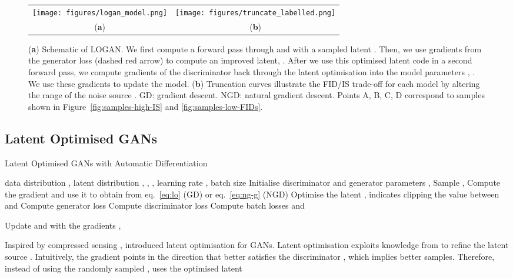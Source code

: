 \documentclass{article} \usepackage{iclr2020_conference,times}
\begin{document}
\begin{figure}[ht]
    \centering
    \begin{tabular}{cc}
    \texttt{[image: figures/logan\_model.png]}  &
    \texttt{[image: figures/truncate\_labelled.png]} \\
    (\textbf{a}) &
    (\textbf{b}) 
    \end{tabular}
    \caption{(\textbf{a}) Schematic of LOGAN. We first compute a forward pass through  and  with a sampled latent . Then, we use gradients from the generator loss (dashed red arrow) to compute an improved latent, . After we use this optimised latent code in a second forward pass, we compute gradients of the discriminator back through the latent optimisation into the model parameters , . We use these gradients to update the model.
    (\textbf{b}) Truncation curves illustrate the FID/IS trade-off for each model by altering the range of the noise source . GD: gradient descent. NGD: natural gradient descent. Points A, B, C, D correspond to samples shown in Figure~\ref{fig:samples-high-IS} and \ref{fig:samples-low-FIDs}.}
    \label{fig:model-truncation}
\end{figure}



\subsection{Latent Optimised GANs}

\begin{algorithm}[tb]
   \caption{Latent Optimised GANs with Automatic Differentiation}
\begin{algorithmic}
    data distribution , latent distribution , , , learning rate , batch size 
   \REPEAT
   \STATE Initialise discriminator and generator parameters , 
       \STATE Sample , 
       \STATE Compute the gradient  and use it to obtain  from eq.~\ref{eq:lo} (GD) or eq.~\ref{eq:ng-g} (NGD)
       \STATE Optimise the latent ,  indicates clipping the value between  and  
       \STATE Compute generator loss 
       \STATE Compute discriminator loss 
   \ENDFOR
   \STATE Compute batch losses
        and
       
   \STATE Update  and  with the gradients , 
\end{algorithmic}
\label{alg}
\end{algorithm}

Inspired by compressed sensing \citep{candes2006stable,donoho2006compressed}, \citet{wu2019deep} introduced latent optimisation for GANs. Latent optimisation exploits knowledge from  to refine the latent source . Intuitively, the gradient  points in the direction that better satisfies the discriminator , which implies better samples. Therefore, instead of using the randomly sampled , \citet{wu2019deep} uses the optimised latent
\end{document}
